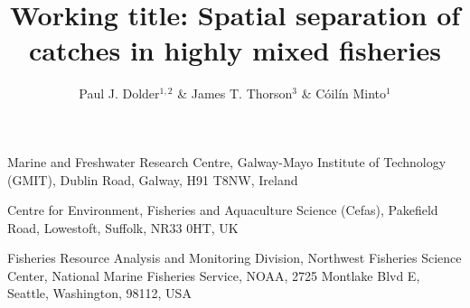 \documentclass{nature}
\title{Working title: Spatial separation of catches in highly mixed fisheries}
\author{Paul J. Dolder$^{1,2}$ \& James T. Thorson$^3$ \& Cóilín Minto$^1$}
\begin{document}
\maketitle

\begin{affiliations}
\item Marine and Freshwater Research Centre, Galway-Mayo Institute of
	Technology (GMIT), Dublin Road, Galway, H91 T8NW, Ireland 
\item Centre for Environment, Fisheries and Aquaculture Science (Cefas),
	Pakefield Road, Lowestoft, Suffolk, NR33 0HT, UK
\item Fisheries Resource Analysis and Monitoring Division, Northwest Fisheries
	Science Center, National Marine Fisheries Service, NOAA, 2725 Montlake
	Blvd E, Seattle, Washington, 98112, USA
\end{affiliations}
\end{document}
